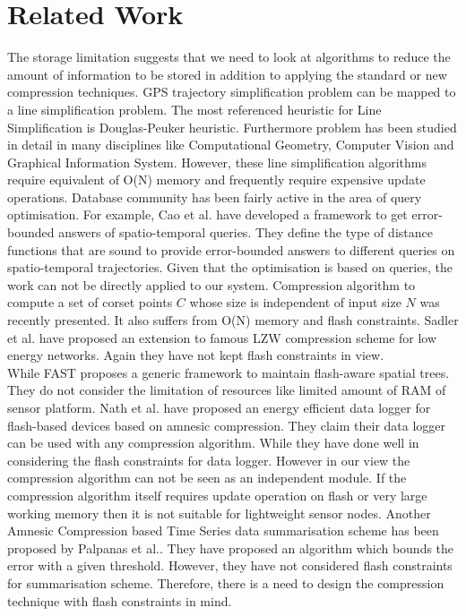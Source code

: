 \documentclass[conference]{IEEEtran}
\begin{document}
\section{Related Work}
The storage limitation suggests that we need to look at algorithms to reduce the amount of information to be stored in addition to applying the standard or new compression techniques.  GPS trajectory simplification problem can be mapped to a line simplification problem. The most referenced  heuristic for Line Simplification is Douglas-Peuker heuristic\cite{peuker-73}. Furthermore problem has been studied in detail in many disciplines like Computational Geometry\cite{geometry-1}\cite{geometry-2}, Computer Vision\cite{vision} and Graphical Information System\cite{peuker-73}\cite{gis}. However, these line simplification algorithms require equivalent of O(N) memory and frequently require expensive update operations. Database community has been fairly active in the area of query optimisation.  For example, Cao et al. have developed a  framework to get error-bounded answers of spatio-temporal queries\cite{Cao:2006:SDR:1147679.1147681}. They define the type of distance functions that are sound to provide error-bounded answers to different queries on spatio-temporal trajectories. Given that the optimisation is based on queries, the work can not be directly applied to our system.  Compression algorithm to compute a set of corset points $C$ whose size is independent of input size $N$ was recently presented\cite{mit-ipsn}. It also suffers from O(N) memory and flash constraints. Sadler et al. have proposed an extension to famous LZW compression scheme for low energy networks. Again they have not kept flash constraints in view.\\
While FAST\cite{sarwat-fast} proposes a generic framework to maintain flash-aware spatial trees. They do not consider the limitation of resources like limited amount of RAM of sensor platform. Nath et al. have proposed an energy efficient data logger for flash-based devices based on amnesic compression\cite{Nath:2009:EES:1602165.1602181}. They claim their data logger can be used with any compression algorithm. While they have done well in considering the flash constraints for data logger. However in our view the compression algorithm can not be seen as an independent module. If the compression algorithm itself requires update operation on flash or very large working memory then it is not suitable for  lightweight sensor nodes. Another Amnesic Compression based Time Series data summarisation scheme has been proposed by Palpanas et al.\cite{amnesic}. They have proposed an algorithm which bounds the error with a given threshold. However, they have not considered flash constraints for summarisation scheme. Therefore, there is a need to design the compression technique with flash constraints in mind.
\end{document}
